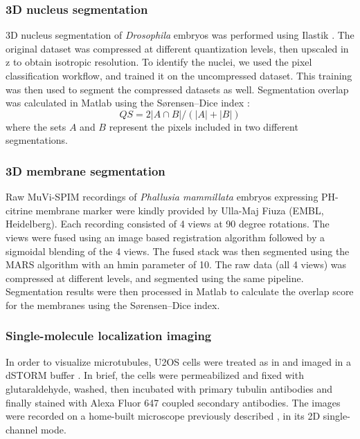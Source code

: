 \subsubsection{3D nucleus segmentation}
3D nucleus segmentation of \textit{Drosophila} embryos was performed using Ilastik \cite{sommer_ilastik:_2011}. The original dataset was compressed at different quantization levels, then upscaled in z to obtain isotropic resolution. To identify the nuclei, we used the pixel classification workflow, and trained it on the uncompressed dataset. This training was then used to segment the compressed datasets as well. Segmentation overlap was calculated in Matlab using the Sørensen–Dice index \cite{sorensen_method_1948,dice_measures_1945}:
\begin{equation}
  QS = 2 \left| A \cap B \right| / \left( |A| + |B| \right)
\end{equation}
where the sets $A$ and $B$ represent the pixels included in two different segmentations.

\subsubsection{3D membrane segmentation}
Raw MuVi-SPIM recordings of \textit{Phallusia mammillata} embryos expressing PH-citrine membrane marker were kindly provided by Ulla-Maj Fiuza (EMBL, Heidelberg). Each recording consisted of 4 views at 90 degree rotations. The views were fused using an image based registration algorithm followed by a sigmoidal blending of the 4 views.
The fused stack was then segmented using the MARS algorithm \cite{fernandez_imaging_2010} with an hmin parameter of 10. The raw data (all 4 views) was compressed at different levels, and segmented using the same pipeline. Segmentation results were then processed in Matlab to calculate the overlap score for the membranes using the Sørensen–Dice index.

\subsubsection{Single-molecule localization imaging}
In order to visualize microtubules, U2OS cells were treated as in \cite{deschamps_3d_2014} and imaged in a dSTORM buffer \cite{heilemann_subdiffraction-resolution_2008}. In brief, the cells were permeabilized and fixed with glutaraldehyde, washed, then incubated with primary tubulin antibodies and finally stained with Alexa Fluor 647 coupled secondary antibodies. The images were recorded on a home-built microscope previously described \cite{deschamps_3d_2014}, in its 2D single-channel mode.

